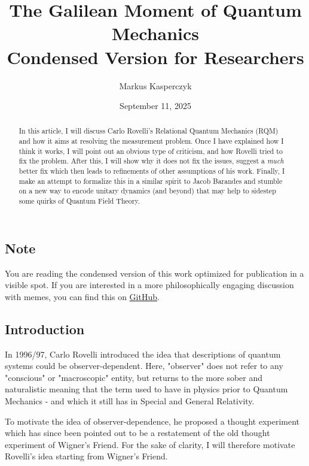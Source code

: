 \documentclass{article}
\title{The Galilean Moment of Quantum Mechanics \\ \large Condensed Version for Researchers}
\author{Markus Kasperczyk}
\date{September 11, 2025}
\begin{document}
\maketitle

\newpage

\begin{abstract}

In this article, I will discuss Carlo Rovelli's Relational Quantum Mechanics (RQM) and how it aims at resolving the measurement problem. Once I have explained how I think it works, I will point out an obvious type of criticism, and how Rovelli tried to fix the problem. After this, I will show why it does not fix the issues, suggest a \textit{much} better fix which then leads to refinements of other assumptions of his work. Finally, I make an attempt to formalize this in a similar spirit to Jacob Barandes and stumble on a new way to encode unitary dynamics (and beyond) that may help to sidestep some quirks of Quantum Field Theory.

\end{abstract}

\newpage

\subsection*{Note}

You are reading the condensed version of this work optimized for publication in a visible spot. If you are interested in a more philosophically engaging discussion with memes, you can find this on \href{https://github.com/GermanBrainRot/Project-Galileo/tree/for-western-audiences}{GitHub}.

\newpage

\tableofcontents

\pagebreak

\subsection*{Introduction}

In 1996/97, Carlo Rovelli introduced \cite{Rovelli_1996} the idea that descriptions of quantum systems could be observer-dependent. Here, "observer" does not refer to any "conscious" or "macroscopic" entity, but returns to the more sober and naturalistic meaning that the term used to have in physics prior to Quantum Mechanics - and which it still has in Special and General Relativity.

To motivate the idea of observer-dependence, he proposed a thought experiment which has since been pointed out \cite{laudisa2017openproblemsrelationalquantum} to be a restatement of the old thought experiment of Wigner's Friend. For the sake of clarity, I will therefore motivate Rovelli's idea starting from Wigner's Friend.
\end{document}
